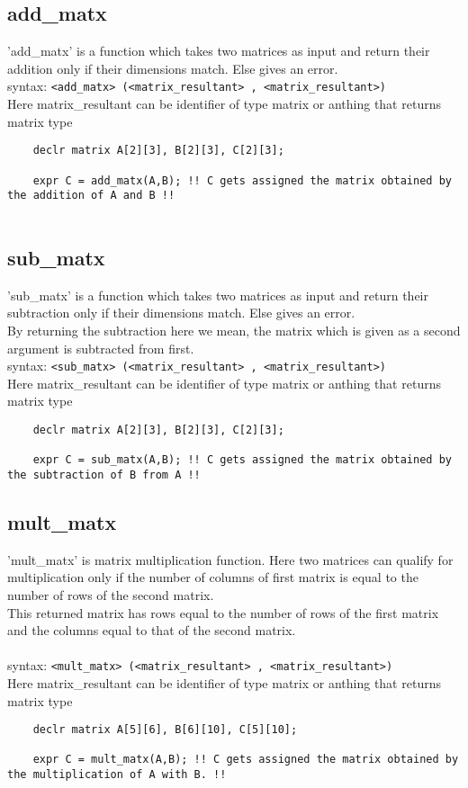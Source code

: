\documentclass[journal, 18pt]{report}
\begin{document}
\subsection{add\_matx}
'add\_matx' is a function which takes two matrices as input and return their addition only if their dimensions match. Else gives an error. \\
syntax: \texttt{<add\_matx> (<matrix\_resultant> , <matrix\_resultant>)}\\
Here matrix\_resultant can be identifier of type matrix or anthing that returns matrix type
\begin{lstlisting}
    declr matrix A[2][3], B[2][3], C[2][3];

    expr C = add_matx(A,B); !! C gets assigned the matrix obtained by the addition of A and B !!
    
\end{lstlisting}
\subsection{sub\_matx}
'sub\_matx' is a function which takes two matrices as input and return their subtraction only if their dimensions match. Else gives an error.\\
By returning the subtraction here we mean, the matrix which is given as a second argument is subtracted from first.\\
syntax: \texttt{<sub\_matx> (<matrix\_resultant> , <matrix\_resultant>)}\\
Here matrix\_resultant can be identifier of type matrix or anthing that returns matrix type
\begin{lstlisting}
    declr matrix A[2][3], B[2][3], C[2][3];

    expr C = sub_matx(A,B); !! C gets assigned the matrix obtained by the subtraction of B from A !!
\end{lstlisting}
\subsection{mult\_matx}
'mult\_matx' is matrix multiplication function. Here two matrices can qualify for multiplication only if the number of columns of first matrix is equal to the number of rows of the second matrix.\\
This returned matrix has rows equal to the number of rows of the first matrix and the columns equal to that of the second matrix.\\\\
syntax: \texttt{<mult\_matx> (<matrix\_resultant> , <matrix\_resultant>)}\\
Here matrix\_resultant can be identifier of type matrix or anthing that returns matrix type
\begin{lstlisting}
    declr matrix A[5][6], B[6][10], C[5][10];

    expr C = mult_matx(A,B); !! C gets assigned the matrix obtained by the multiplication of A with B. !!
\end{lstlisting}
\end{document}
